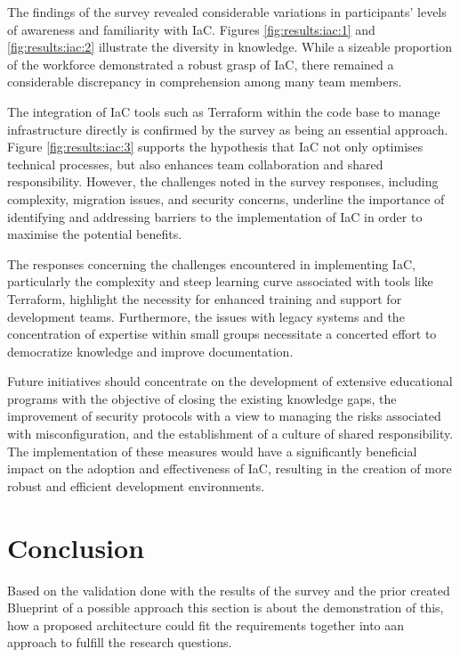 The findings of the survey revealed considerable variations in participants' levels of awareness and familiarity with \ac{IaC}. Figures \ref{fig:results:iac:1} and \ref{fig:results:iac:2} illustrate the diversity in knowledge. While a sizeable proportion of the workforce demonstrated a robust grasp of \ac{IaC}, there remained a considerable discrepancy in comprehension among many team members.

The integration of \ac{IaC} tools such as Terraform within the code base to manage infrastructure directly is confirmed by the survey as being an essential approach. Figure \ref{fig:results:iac:3} supports the hypothesis that \ac{IaC} not only optimises technical processes, but also enhances team collaboration and shared responsibility. However, the challenges noted in the survey responses, including complexity, migration issues, and security concerns, underline the importance of identifying and addressing barriers to the implementation of \ac{IaC} in order to maximise the potential benefits.

The responses concerning the challenges encountered in implementing \ac{IaC}, particularly the complexity and steep learning curve associated with tools like Terraform, highlight the necessity for enhanced training and support for development teams. Furthermore, the issues with legacy systems and the concentration of expertise within small groups necessitate a concerted effort to democratize knowledge and improve documentation.

Future initiatives should concentrate on the development of extensive educational programs with the objective of closing the existing knowledge gaps, the improvement of security protocols with a view to managing the risks associated with misconfiguration, and the establishment of a culture of shared responsibility. The implementation of these measures would have a significantly beneficial impact on the adoption and effectiveness of \ac{IaC}, resulting in the creation of more robust and efficient development environments.

\section{Conclusion}
Based on the validation done with the results of the survey and the prior created Blueprint of a possible approach this section is about the demonstration of this, how a proposed architecture could fit the requirements together into aan approach to fulfill the research questions.

